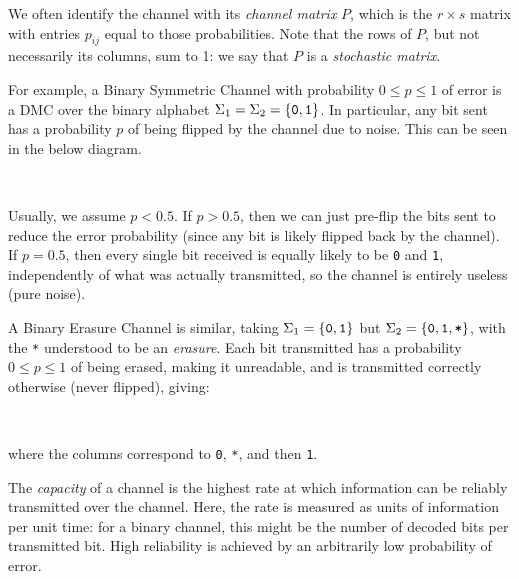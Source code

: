 \documentclass{article}
\begin{document}
We often identify the channel with its \textit{channel matrix} $P$, which is the $r \times s$ matrix with entries $p_{ij}$ equal to those probabilities. Note that the rows of $P$, but not necessarily its columns, sum to 1: we say that $P$ is a \textit{stochastic matrix}.

\begin{example}
	\label{binary-symmetric-erasure-channel}
	For example, a Binary Symmetric Channel with probability $0 \leq p \leq 1$ of error is a DMC over the binary alphabet $\Sigma_1 = \Sigma_2 = \left\lbrace \texttt{0}, \texttt{1} \right\rbrace$. In particular, any bit sent has a probability $p$ of being flipped by the channel due to noise. This can be seen in the below diagram.

	\  \

	Usually, we assume $p < 0.5$. If $p > 0.5$, then we can just pre-flip the bits sent to reduce the error probability (since any bit is likely flipped back by the channel). If $p = 0.5$, then every single bit received is equally likely to be \texttt{0} and \texttt{1}, independently of what was actually transmitted, so the channel is entirely useless (pure noise).

	A Binary Erasure Channel is similar, taking $\Sigma_1 = \left\lbrace \texttt{0}, \texttt{1} \right\rbrace$ but $\Sigma_2 = \left\lbrace \texttt{0}, \texttt{1}, \texttt{*} \right\rbrace$, with the \texttt{*} understood to be an \textit{erasure}. Each bit transmitted has a probability $0 \leq p \leq 1$ of being erased, making it unreadable, and is transmitted correctly otherwise (never flipped), giving:

	\  \

	where the columns correspond to \texttt{0}, \texttt{*}, and then \texttt{1}.

\end{example}

\begin{definition}[Capacity]
	\label{capacity-definition-heuristic}
    The \textit{capacity} of a channel is the highest rate at which information can be reliably transmitted over the channel. Here, the rate is measured as units of information per unit time: for a binary channel, this might be the number of decoded bits per transmitted bit. High reliability is achieved by an arbitrarily low probability of error.
\end{definition}

\end{document}
